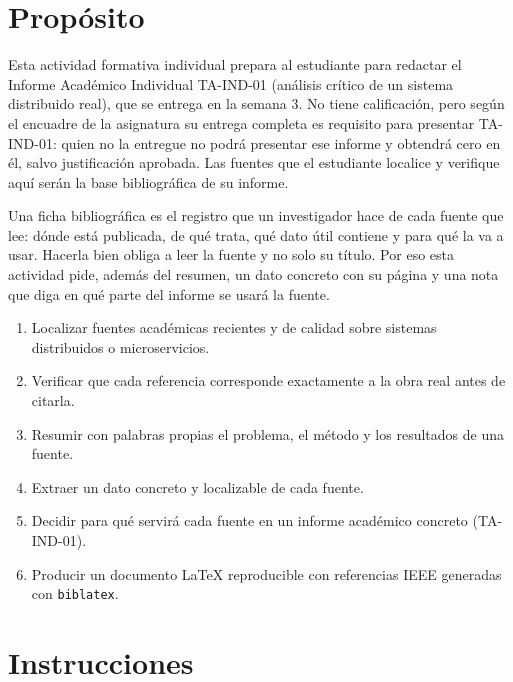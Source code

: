 \documentclass[11pt,a4paper]{article}
\begin{document}
\section{Propósito}

Esta actividad formativa individual prepara al estudiante para redactar el Informe Académico Individual TA-IND-01 (análisis crítico de un sistema distribuido real), que se entrega en la semana 3. No tiene calificación, pero según el encuadre de la asignatura su entrega completa es requisito para presentar TA-IND-01: quien no la entregue no podrá presentar ese informe y obtendrá cero en él, salvo justificación aprobada. Las fuentes que el estudiante localice y verifique aquí serán la base bibliográfica de su informe.

Una ficha bibliográfica es el registro que un investigador hace de cada fuente que lee: dónde está publicada, de qué trata, qué dato útil contiene y para qué la va a usar. Hacerla bien obliga a leer la fuente y no solo su título. Por eso esta actividad pide, además del resumen, un dato concreto con su página y una nota que diga en qué parte del informe se usará la fuente.

\begin{infoBox}[title={Lo que se espera que el estudiante sea capaz de hacer al terminar}]
	\begin{enumerate}
		\item Localizar fuentes académicas recientes y de calidad sobre sistemas distribuidos o microservicios.
		\item Verificar que cada referencia corresponde exactamente a la obra real antes de citarla.
		\item Resumir con palabras propias el problema, el método y los resultados de una fuente.
		\item Extraer un dato concreto y localizable de cada fuente.
		\item Decidir para qué servirá cada fuente en un informe académico concreto (TA-IND-01).
		\item Producir un documento \LaTeX{} reproducible con referencias IEEE generadas con \texttt{biblatex}.
	\end{enumerate}
\end{infoBox}

\section{Instrucciones}
\end{document}
